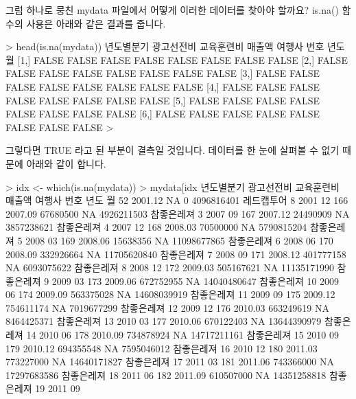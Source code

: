 \documentclass[tutorial.tex]{subfiles}
\begin{document}
그럼 하나로 뭉친 mydata 파일에서 어떻게 이러한 데이터를 찾아야 할까요?
is.na() 함수의 사용은 아래와 같은 결과를 줍니다. 

\begin{Schunk}
\begin{Soutput}
> head(is.na(mydata))
     년도별분기 광고선전비 교육훈련비 매출액 여행사  번호  년도    월
[1,]      FALSE      FALSE      FALSE  FALSE  FALSE FALSE FALSE FALSE
[2,]      FALSE      FALSE      FALSE  FALSE  FALSE FALSE FALSE FALSE
[3,]      FALSE      FALSE      FALSE  FALSE  FALSE FALSE FALSE FALSE
[4,]      FALSE      FALSE      FALSE  FALSE  FALSE FALSE FALSE FALSE
[5,]      FALSE      FALSE      FALSE  FALSE  FALSE FALSE FALSE FALSE
[6,]      FALSE      FALSE      FALSE  FALSE  FALSE FALSE FALSE FALSE
> 
\end{Soutput}
\end{Schunk}

그렇다면 TRUE 라고 된 부분이 결측일 것입니다.  
데이터를 한 눈에 살펴볼 수 없기 때문에 아래와 같이 합니다. 

\begin{Schunk}
\begin{Soutput}
> idx <- which(is.na(mydata))
> mydata[idx%%nrow(mydata), ]
    년도별분기 광고선전비 교육훈련비      매출액     여행사 번호 년도 월
52     2001.12         NA          0  4096816401 레드캡투어    8 2001 12
166    2007.09   67680500         NA  4926211503 참좋은레져    3 2007 09
167    2007.12   24490909         NA  3857238621 참좋은레져    4 2007 12
168    2008.03   70500000         NA  5790815204 참좋은레져    5 2008 03
169    2008.06   15638356         NA 11098677865 참좋은레져    6 2008 06
170    2008.09  332926664         NA 11705620840 참좋은레져    7 2008 09
171    2008.12  401777158         NA  6093075622 참좋은레져    8 2008 12
172    2009.03  505167621         NA 11135171990 참좋은레져    9 2009 03
173    2009.06  672752955         NA 14040480647 참좋은레져   10 2009 06
174    2009.09  563375028         NA 14608039919 참좋은레져   11 2009 09
175    2009.12  754611174         NA  7019677299 참좋은레져   12 2009 12
176    2010.03  663249619         NA  8464425371 참좋은레져   13 2010 03
177    2010.06  670122403         NA 13644390979 참좋은레져   14 2010 06
178    2010.09  734878924         NA 14717211161 참좋은레져   15 2010 09
179    2010.12  694355548         NA  7595046012 참좋은레져   16 2010 12
180    2011.03  773227000         NA 14640171827 참좋은레져   17 2011 03
181    2011.06  743366000         NA 17297683586 참좋은레져   18 2011 06
182    2011.09  610507000         NA 14351258818 참좋은레져   19 2011 09
\end{Soutput}
\end{Schunk}
\end{document}
